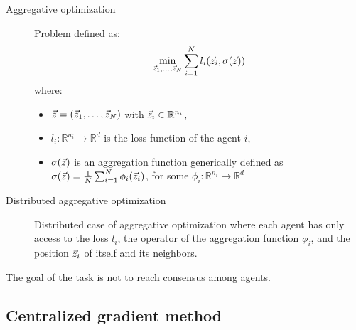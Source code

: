 \begin{description}
    \item[Aggregative optimization] 
        Problem defined as:
        \[
            \min_{{\vec{z}}_1, \dots, {\vec{z}}_N} \sum_{i=1}^{N} l_i({\vec{z}}_i, \sigma({\vec{z}}))
        \]
        where:
        \begin{itemize}
            \item ${\vec{z}} = ({\vec{z}}_1, \dots, {\vec{z}}_N)$ with ${\vec{z}}_i \in \mathbb{R}^{n_i}$,
            \item $l_i: \mathbb{R}^{n_i} \rightarrow \mathbb{R}^d$ is the loss function of the agent $i$,
            \item $\sigma({\vec{z}})$ is an aggregation function generically defined as $\sigma({\vec{z}}) = \frac{1}{N} \sum_{i=1}^{N} \phi_i({\vec{z}}_i)$, for some $\phi_i: \mathbb{R}^{n_i} \rightarrow \mathbb{R}^d$
        \end{itemize}

    \item[Distributed aggregative optimization] 
        Distributed case of aggregative optimization where each agent has only access to the loss $l_i$, the operator of the aggregation function $\phi_i$, and the position ${\vec{z}}_i$ of itself and its neighbors.
\end{description}

\begin{remark}
    The goal of the task is not to reach consensus among agents.
\end{remark}


\subsection{Centralized gradient method}

